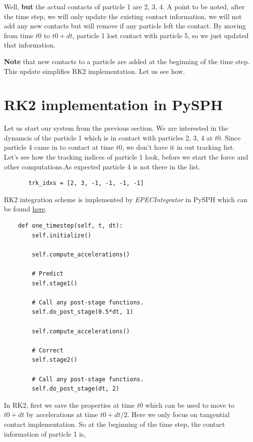 \documentclass[11pt]{article}
\begin{document}
Well, \textbf{but} the actual contacts of particle 1 are 2, 3, 4. A point to be
noted, after the time step, we will only update the existing contact
information, we will not add any new contacts but will remove if any particle
left the contact. By moving from time \(t0\) to \(t0+dt\), particle 1
lost contact with particle 5, so we just updated that information.

\textbf{Note} that new contacts to a particle are added at the beginning of the time
step.  This update simplifies RK2 implementation. Let us see how.


\section{RK2 implementation in PySPH}
\label{sec:org8a9a5bb}
Let us start our system from the previous section. We are interested in the
dynamcis of the particle 1 which is in contact with
particles 2, 3, 4 at \(t0\). Since particle 4 came in to contact at time \(t0\), we don't
have it in out tracking list. Let's see how the tracking indices of particle 1
look, before we start the force and other computations.As expected particle 4
is not there in the list.

\begin{verbatim}
       trk_idxs = [2, 3, -1, -1, -1, -1]
\end{verbatim}

RK2 integration scheme is implemented by \emph{EPECIntegrator} in PySPH which can
be found \href{https://github.com/pypr/pysph/blob/master/pysph/sph/integrator.py\#L249}{here}.

\begin{verbatim}
	def one_timestep(self, t, dt):
	    self.initialize()

	    self.compute_accelerations()

	    # Predict
	    self.stage1()

	    # Call any post-stage functions.
	    self.do_post_stage(0.5*dt, 1)

	    self.compute_accelerations()

	    # Correct
	    self.stage2()

	    # Call any post-stage functions.
	    self.do_post_stage(dt, 2)
\end{verbatim}


In RK2, first we save the properties at time \(t0\) which can be used to move to
\(t0+dt\) by accelerations at time \(t0+dt/2\). Here we only focus on tangential
contact implementation. So at the beginning of the time step, the contact
information of particle 1 is,
\end{document}
